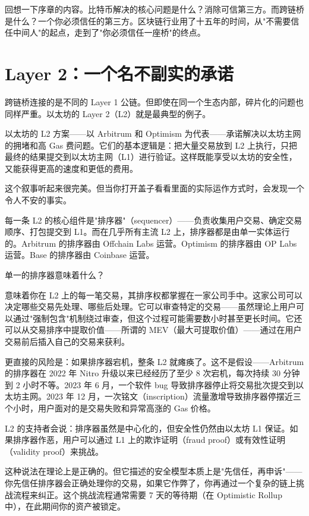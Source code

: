 \documentclass[a4paper,12pt,openany]{ctexbook}
\begin{document}
回想一下序章的内容。比特币解决的核心问题是什么？消除可信第三方。而跨链桥是什么？一个你必须信任的第三方。区块链行业用了十五年的时间，从"不需要信任中间人"的起点，走到了"你必须信任一座桥"的终点。


\section*{Layer 2：一个名不副实的承诺}


跨链桥连接的是不同的 Layer 1 公链。但即使在同一个生态内部，碎片化的问题也同样严重。以太坊的 Layer 2（L2）就是最典型的例子。

以太坊的 L2 方案——以 Arbitrum 和 Optimism 为代表——承诺解决以太坊主网的拥堵和高 Gas 费问题。它们的基本逻辑是：把大量交易放到 L2 上执行，只把最终的结果提交到以太坊主网（L1）进行验证。这样既能享受以太坊的安全性，又能获得更高的速度和更低的费用。

这个叙事听起来很完美。但当你打开盖子看看里面的实际运作方式时，会发现一个令人不安的事实。

每一条 L2 的核心组件是"排序器"（sequencer）——负责收集用户交易、确定交易顺序、打包提交到 L1。而在几乎所有主流 L2 上，排序器都是由单一实体运行的。Arbitrum 的排序器由 Offchain Labs 运营。Optimism 的排序器由 OP Labs 运营。Base 的排序器由 Coinbase 运营。

单一的排序器意味着什么？

意味着你在 L2 上的每一笔交易，其排序权都掌握在一家公司手中。这家公司可以决定哪些交易先处理、哪些后处理。它可以审查特定的交易——虽然理论上用户可以通过"强制包含"机制绕过审查，但这个过程可能需要数小时甚至更长时间。它还可以从交易排序中提取价值——所谓的 MEV（最大可提取价值）——通过在用户交易前后插入自己的交易来获利。

更直接的风险是：如果排序器宕机，整条 L2 就瘫痪了。这不是假设——Arbitrum 的排序器在 2022 年 Nitro 升级以来已经经历了至少 8 次宕机，每次持续 30 分钟到 2 小时不等。2023 年 6 月，一个软件 bug 导致排序器停止将交易批次提交到以太坊主网。2023 年 12 月，一次铭文（inscription）流量激增导致排序器停摆近三个小时，用户面对的是交易失败和异常高涨的 Gas 价格。

L2 的支持者会说：排序器虽然是中心化的，但安全性仍然由以太坊 L1 保证。如果排序器作恶，用户可以通过 L1 上的欺诈证明（fraud proof）或有效性证明（validity proof）来挑战。

这种说法在理论上是正确的。但它描述的安全模型本质上是"先信任，再申诉"——你先信任排序器会正确处理你的交易，如果它作弊了，你再通过一个复杂的链上挑战流程来纠正。这个挑战流程通常需要 7 天的等待期（在 Optimistic Rollup 中），在此期间你的资产被锁定。
\end{document}

